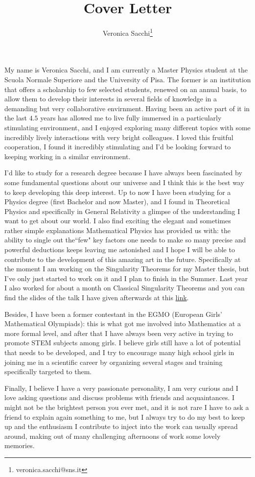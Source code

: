 \documentclass[12pt, a4paper]{article}
\title{Cover Letter}
\author{Veronica Sacchi\thanks{veronica.sacchi@sns.it}}
\begin{document}
\maketitle

My name is Veronica Sacchi, and I am currently a Master Physics student at the Scuola Normale Superiore and the University of Pisa. The former is an institution that offers a scholarship to few selected students, renewed on an annual basis, to allow them to develop their interests in several fields of knowledge in a demanding but very collaborative envirnment.
Having been an active part of it in the last \(4.5\) years has allowed me to live fully immersed in a particularly stimulating environment, and I enjoyed exploring many different topics with some incredibly lively interactions with very bright colleagues. I loved this fruitful cooperation, I found it incredibly stimulating and I'd be looking forward to keeping working in a similar environment.

I'd like to study for a research degree because I have always been fascinated by some fundamental questions about our universe and I think this is the best way to keep developing this deep interest.
Up to now I have been studying for a Physics degree (first Bachelor and now Master), and I found in Theoretical Physics and specifically in General Relativity a glimpse of the understanding I want to get about our world. 
I also find exciting the elegant and sometimes rather simple explanations Mathematical Physics has provided us with: the ability to single out the``few" key factors one needs to make so many precise and powerful deductions keeps leaving me astonished and I hope I will be able to contribute to the development of this amazing art in the future.
Specifically at the moment I am working on the Singularity Theorems for my Master thesis, but I've only just started to work on it and I plan to finish in the Summer.
Last year I also worked for about a month on Classical Singularity Theorems and you can find the slides of the talk I have given afterwards at this \href{https://uz.sns.it/~ver22albireo/ext-file/colloquio/slides.pdf}{link}.

Besides, I have been a former contestant in the EGMO (European Girls' Mathematical Olympiads): this is what got me involved into Mathematics at a more formal level, and after that I have always been very active in trying to promote STEM subjects among girls. I believe girls still have a lot of potential that needs to be developed, and I try to encourage many high school girls in joining me in a scientific career by organizing several stages and training specifically targeted to them.

Finally, I believe I have a very passionate personality, I am very curious and I love asking questions and discuss problems with friends and acquaintances. I might not be the brightest person you ever met, and it is not rare I have to ask a friend to explain again something to me, but I always try to do my best to keep up and the enthusiasm I contribute to inject into the work can usually spread around, making out of many challenging afternoons of work some lovely memories.
\end{document}
